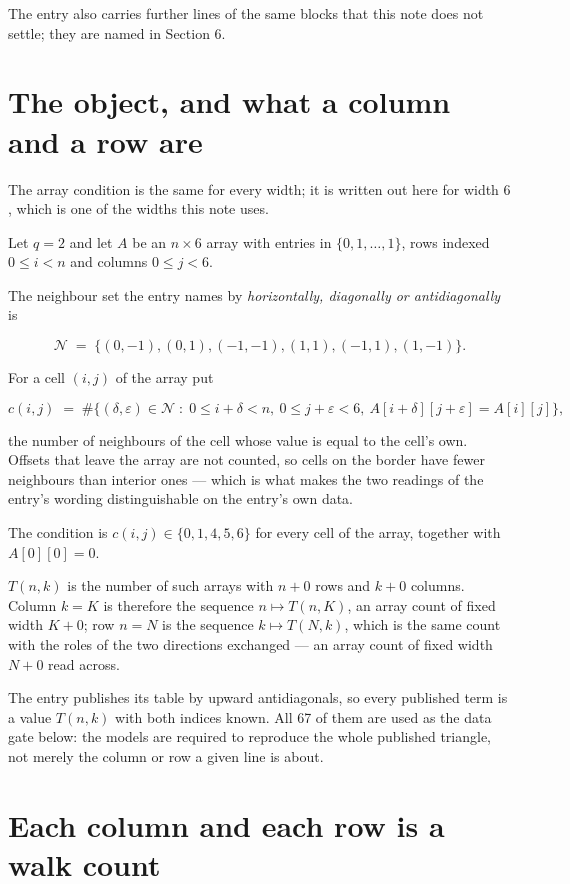 \documentclass[11pt]{article}
\theoremstyle{definition}
\begin{document}
The entry also carries further lines of the same blocks that this note does not settle; they are named in Section 6.

\section{The object, and what a column and a row are}

The array condition is the same for every width; it is written out here for width $6$, which is one of the widths this note uses.

Let $q = 2$ and let $A$ be an $n \times 6$ array with entries in $\{0,1,\dots,1\}$, rows indexed $0 \le i < n$ and columns $0 \le j < 6$.

The neighbour set the entry names by {\itshape horizontally, diagonally or antidiagonally} is

\[\mathcal{N} \;=\; \{(0,-1), (0,1), (-1,-1), (1,1), (-1,1), (1,-1)\}.\]

For a cell $(i,j)$ of the array put

\[c(i,j) \;=\; \#\bigl\{(\delta,\varepsilon)\in\mathcal{N} \;:\; 0\le i+\delta<n,\ 0\le j+\varepsilon<6,\ A[i+\delta][j+\varepsilon] = A[i][j]\bigr\},\]

the number of neighbours of the cell whose value is equal to the cell's own. Offsets that leave the array are not counted, so cells on the border have fewer neighbours than interior ones --- which is what makes the two readings of the entry's wording distinguishable on the entry's own data.

The condition is $c(i,j) \in \{0, 1, 4, 5, 6\}$ for every cell of the array, together with $A[0][0]=0$.

$T(n,k)$ is the number of such arrays with $n + 0$ rows and $k + 0$ columns. Column $k = K$ is therefore the sequence $n \mapsto T(n,K)$, an array count of fixed width $K + 0$; row $n = N$ is the sequence $k \mapsto T(N,k)$, which is the same count with the roles of the two directions exchanged --- an array count of fixed width $N + 0$ read across.

The entry publishes its table by upward antidiagonals, so every published term is a value $T(n,k)$ with both indices known. All 67 of them are used as the data gate below: the models are required to reproduce the whole published triangle, not merely the column or row a given line is about.

\section{Each column and each row is a walk count}
\end{document}
